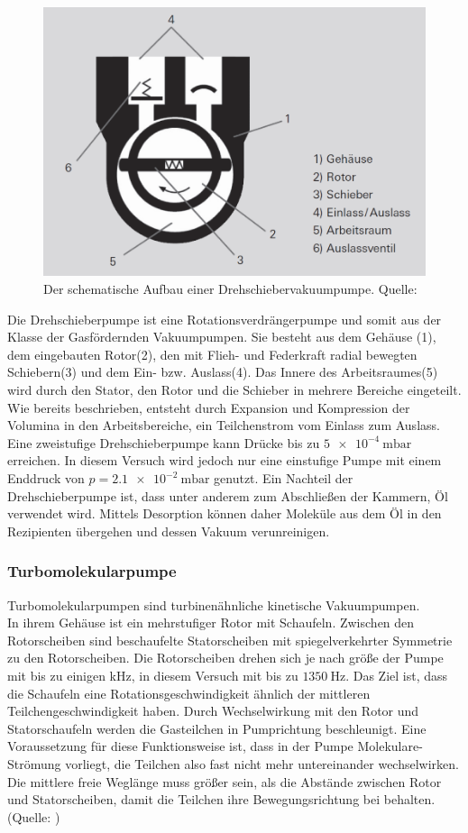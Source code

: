 			\begin{figure}
				\centering
				\includegraphics[width=0.5\linewidth]{"latex/images/Drehschieber.png"}
				\caption{Der schematische Aufbau einer Drehschiebervakuumpumpe. \protect Quelle: \cite{pfeiffer:pump}}
				\label{fig:dreh}
			\end{figure}  

			\noindent
			Die Drehschieberpumpe ist eine Rotationsverdrängerpumpe und somit aus der Klasse der Gasfördernden Vakuumpumpen.
			Sie besteht aus dem Gehäuse (1), dem eingebauten Rotor(2), den mit Flieh- und Federkraft radial bewegten Schiebern(3) und dem Ein- bzw. Auslass(4).
			Das Innere des Arbeitsraumes(5) wird durch den Stator, den Rotor und die Schieber in mehrere Bereiche eingeteilt. 
			Wie bereits beschrieben, entsteht durch Expansion und Kompression der Volumina in den Arbeitsbereiche, ein Teilchenstrom vom Einlass zum Auslass. 
			Eine zweistufige Drehschieberpumpe kann Drücke bis zu $\SI{5e-4}{\milli\bar}$ erreichen. 
			In diesem Versuch wird jedoch nur eine einstufige Pumpe mit einem Enddruck von $p = \SI{2.1 e-2}{\milli\bar}$ genutzt.
			Ein Nachteil der Drehschieberpumpe ist, dass unter anderem zum Abschließen der Kammern, Öl verwendet wird.
			Mittels Desorption können daher Moleküle aus dem Öl in den Rezipienten übergehen und dessen Vakuum verunreinigen.	 

		\subsubsection{Turbomolekularpumpe}
		
			\noindent
			Turbomolekularpumpen sind turbinenähnliche kinetische Vakuumpumpen.\\ 
			In ihrem Gehäuse ist ein mehrstufiger Rotor mit Schaufeln.
			Zwischen den Rotorscheiben sind beschaufelte Statorscheiben mit spiegelverkehrter Symmetrie zu den Rotorscheiben.
			Die Rotorscheiben drehen sich je nach größe der Pumpe mit bis zu einigen kHz, in diesem Versuch mit bis zu $\SI{1350}{\hertz}$.
			Das Ziel ist, dass die Schaufeln eine Rotationsgeschwindigkeit ähnlich der mittleren Teilchengeschwindigkeit haben.
			Durch Wechselwirkung mit den Rotor und Statorschaufeln werden die Gasteilchen in Pumprichtung beschleunigt.
			Eine Voraussetzung für diese Funktionsweise ist, dass in der Pumpe Molekulare-Strömung vorliegt, die Teilchen also fast nicht mehr untereinander wechselwirken.
			Die mittlere freie Weglänge muss größer sein, als die Abstände zwischen Rotor und Statorscheiben, damit die Teilchen ihre Bewegungsrichtung bei behalten.\\
			(Quelle: \cite{pfeiffer:pump})
			  					
